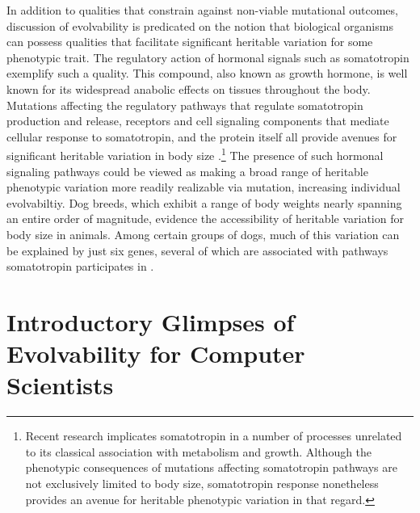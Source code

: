 In addition to qualities that constrain against non-viable mutational outcomes, discussion of evolvability is predicated on the notion that biological organisms can possess qualities that facilitate significant heritable variation for some phenotypic trait.
The regulatory action of hormonal signals such as somatotropin exemplify such a quality. This compound, also known as growth hormone, is well known for its widespread anabolic effects on tissues throughout the body.
Mutations affecting the regulatory pathways that regulate somatotropin production and release, receptors and cell signaling components that mediate cellular response to somatotropin, and the protein itself all provide avenues for significant heritable variation in body size \cite{Devesa2016MultipleGrowth}.\footnote
{Recent research implicates somatotropin in a number of processes unrelated to its classical association with metabolism and growth. Although the phenotypic consequences of mutations affecting somatotropin pathways are not exclusively limited to body size, somatotropin response nonetheless provides an avenue for heritable phenotypic variation in that regard.}
The presence of such hormonal signaling pathways could be viewed as making a broad range of heritable phenotypic variation more readily realizable via mutation, increasing individual evolvabiltiy.
Dog breeds, which exhibit a range of body weights nearly spanning an entire order of magnitude, evidence the accessibility of heritable variation for body size in animals.
Among certain groups of dogs, much of this variation can be explained by just six genes, several of which are associated with pathways somatotropin participates in \cite{Rimbault2013DerivedBreeds.}.

\section{Introductory Glimpses of Evolvability for Computer Scientists} \label{sec:glimpses-computer-scientists}


